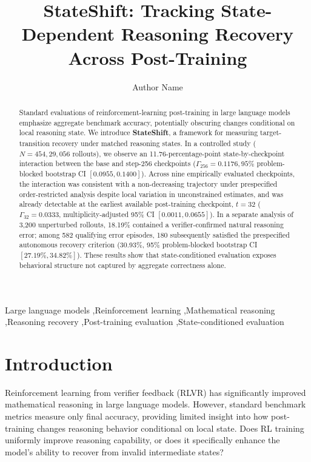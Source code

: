 \documentclass[11pt,3p,review]{elsarticle}
\begin{document}
\begin{frontmatter}

\title{StateShift: Tracking State-Dependent Reasoning Recovery Across Post-Training}

\author[inst1]{Author Name}
\address[inst1]{Department Name, Institution Name, City, Country}

\begin{abstract}
Standard evaluations of reinforcement-learning post-training in large language models emphasize aggregate benchmark accuracy, potentially obscuring changes conditional on local reasoning state. We introduce \textbf{StateShift}, a framework for measuring target-transition recovery under matched reasoning states. In a controlled study ($N=454, 29,056$ rollouts), we observe an 11.76-percentage-point state-by-checkpoint interaction between the base and step-256 checkpoints ($\Gamma_{256}=0.1176, 95\%$ problem-blocked bootstrap CI $[0.0955, 0.1400]$). Across nine empirically evaluated checkpoints, the interaction was consistent with a non-decreasing trajectory under prespecified order-restricted analysis despite local variation in unconstrained estimates, and was already detectable at the earliest available post-training checkpoint, $t=32$ ($\Gamma_{32}=0.0333$, multiplicity-adjusted 95\% CI $[0.0011, 0.0655]$). In a separate analysis of 3,200 unperturbed rollouts, 18.19\% contained a verifier-confirmed natural reasoning error; among 582 qualifying error episodes, 180 subsequently satisfied the prespecified autonomous recovery criterion (30.93\%, 95\% problem-blocked bootstrap CI $[27.19\%, 34.82\%]$). These results show that state-conditioned evaluation exposes behavioral structure not captured by aggregate correctness alone.
\end{abstract}

\begin{keyword}
Large language models \sep Reinforcement learning \sep Mathematical reasoning \sep Reasoning recovery \sep Post-training evaluation \sep State-conditioned evaluation
\end{keyword}

\end{frontmatter}

\section{Introduction}
Reinforcement learning from verifier feedback (RLVR) has significantly improved mathematical reasoning in large language models. However, standard benchmark metrics measure only final accuracy, providing limited insight into how post-training changes reasoning behavior conditional on local state. Does RL training uniformly improve reasoning capability, or does it specifically enhance the model's ability to recover from invalid intermediate states?
\end{document}
